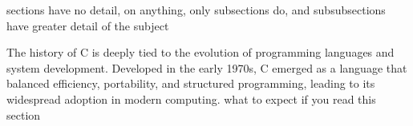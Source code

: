 \begin{NxSBox}[][Introduction to C]
	\begin{NxIDBox}
		sections have no detail, on anything, only subsections do, and subsubsections have greater detail of the subject
	\end{NxIDBox}
	\begin{NxIDBoxL}
		 The history of C is deeply tied to the evolution of programming languages and system development. Developed in the early 1970s, C emerged as a language that balanced efficiency, portability, and structured programming, leading to its widespread adoption in modern computing.
		what to expect if you read this section
	\end{NxIDBoxL}
\end{NxSBox}



